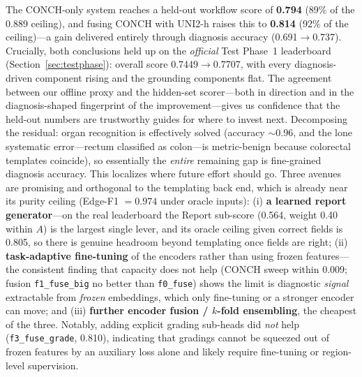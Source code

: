 \documentclass[11pt,a4paper]{article}
\newcommand{\code}[1]{\texttt{\small #1}}
\begin{document}
The CONCH-only system reaches a held-out workflow score of \textbf{0.794} (89\% of the 0.889
ceiling), and fusing CONCH with UNI2-h raises this to \textbf{0.814} (92\% of the ceiling)---a
gain delivered entirely through diagnosis accuracy (0.691$\rightarrow$0.737). Crucially, both
conclusions held up on the \emph{official} Test Phase~1 leaderboard
(Section~\ref{sec:testphase}): overall score 0.7449$\rightarrow$0.7707, with every
diagnosis-driven component rising and the grounding components flat. The agreement between our
offline proxy and the hidden-set scorer---both in direction and in the diagnosis-shaped fingerprint
of the improvement---gives us confidence that the held-out numbers are trustworthy guides for where
to invest next. Decomposing the residual: organ recognition is effectively solved (accuracy
$\sim$0.96, and the lone systematic error---rectum classified as colon---is metric-benign because
colorectal templates coincide), so essentially the \emph{entire} remaining gap is fine-grained
diagnosis accuracy. This localizes where future effort should go. Three avenues are promising and
orthogonal to the templating back end, which is already near its purity ceiling
(Edge-F1 $=0.974$ under oracle inputs): (i) \textbf{a learned report generator}---on the real
leaderboard the Report sub-score (0.564, weight 0.40 within $A$) is the largest single lever, and
its oracle ceiling given correct fields is 0.805, so there is genuine headroom beyond templating
once fields are right; (ii) \textbf{task-adaptive fine-tuning} of the encoders rather than using
frozen features---the consistent finding that capacity does not help (CONCH sweep within 0.009;
fusion \code{f1\_fuse\_big} no better than \code{f0\_fuse}) shows the limit is diagnostic
\emph{signal} extractable from \emph{frozen} embeddings, which only fine-tuning or a stronger
encoder can move; and (iii) \textbf{further encoder fusion / $k$-fold ensembling}, the cheapest
of the three. Notably, adding explicit grading sub-heads did \emph{not} help
(\code{f3\_fuse\_grade}, 0.810), indicating that gradings cannot be squeezed out of frozen features
by an auxiliary loss alone and likely require fine-tuning or region-level supervision.
\end{document}

